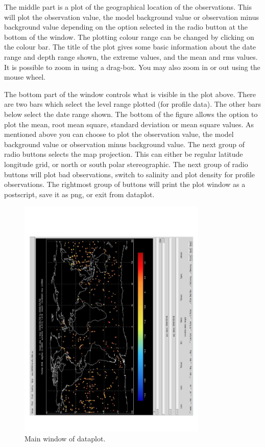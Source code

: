 The middle part is a plot of the geographical location of the observations. This will plot the
observation value, the model background value or observation minus background value depending
on the option selected in the radio button at the bottom of the window. The plotting colour
range can be changed by clicking on the colour bar. The title of the plot gives some basic
information about the date range and depth range shown, the extreme values, and the mean and
rms values. It is possible to zoom in using a drag-box. You may also zoom in or out using the
mouse wheel.

The bottom part of the window controls what is visible in the plot above. There are two bars
which select the level range plotted (for profile data). The other bars below select the date
range shown. The bottom of the figure allows the option to plot the mean, root mean square,
standard deviation or mean square values. As mentioned above you can choose to plot the
observation value, the model background value or observation minus background value. The next
group of radio buttons selects the map projection. This can either be regular latitude
longitude grid, or north or south polar stereographic. The next group of radio buttons will
plot bad observations, switch to salinity and plot density for profile observations. The
rightmost group of buttons will print the plot window as a postscript, save it as png, or exit
from dataplot.

\begin{figure}     \begin{center}
\includegraphics[width=9cm,angle=-90.]{./TexFiles/Figures/Fig_OBS_dataplot_main}
\caption{      \label{fig:obsdataplotmain}
Main window of dataplot.}
\end{center}     \end{figure}

